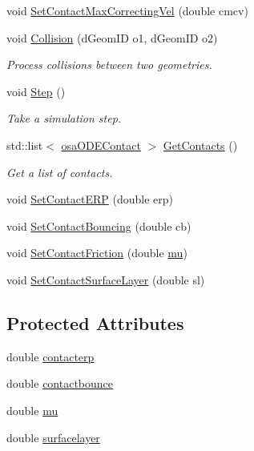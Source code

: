 \begin{DoxyCompactItemize}
\item 
void \hyperlink{classosa_o_d_e_world_a9fd2c069bfb1ad2f292311bc2dac78e5}{Set\+Contact\+Max\+Correcting\+Vel} (double cmcv)
\item 
void \hyperlink{classosa_o_d_e_world_ac259e47ae2b8f33f653e1ebfae73dce9}{Collision} (d\+Geom\+I\+D o1, d\+Geom\+I\+D o2)
\begin{DoxyCompactList}\small\item\em Process collisions between two geometries. \end{DoxyCompactList}\item 
void \hyperlink{classosa_o_d_e_world_ad355de908d3d45436dadf47c542c4182}{Step} ()
\begin{DoxyCompactList}\small\item\em Take a simulation step. \end{DoxyCompactList}\item 
std\+::list$<$ \hyperlink{structosa_o_d_e_contact}{osa\+O\+D\+E\+Contact} $>$ \hyperlink{classosa_o_d_e_world_a6e75ac4b7140e26bb381f1f5f388e998}{Get\+Contacts} ()
\begin{DoxyCompactList}\small\item\em Get a list of contacts. \end{DoxyCompactList}\item 
void \hyperlink{classosa_o_d_e_world_a43e84fc406edd956147c746de290ad5c}{Set\+Contact\+E\+R\+P} (double erp)
\item 
void \hyperlink{classosa_o_d_e_world_a107cf01ae0e9f24279673a406429b059}{Set\+Contact\+Bouncing} (double cb)
\item 
void \hyperlink{classosa_o_d_e_world_abacdd957195b8877c13ff75c627897d9}{Set\+Contact\+Friction} (double \hyperlink{classosa_o_d_e_world_ad480cb0282cb22313a485083b24dd242}{mu})
\item 
void \hyperlink{classosa_o_d_e_world_a45166aabfeeeed39909c7e44933d775b}{Set\+Contact\+Surface\+Layer} (double sl)
\end{DoxyCompactItemize}
\subsection*{Protected Attributes}
\begin{DoxyCompactItemize}
\item 
double \hyperlink{classosa_o_d_e_world_aade62058b4fd841e2d78cc9bdbf83b5d}{contacterp}
\item 
double \hyperlink{classosa_o_d_e_world_a32473325798a042ba65d0bcf43b11860}{contactbounce}
\item 
double \hyperlink{classosa_o_d_e_world_ad480cb0282cb22313a485083b24dd242}{mu}
\item 
double \hyperlink{classosa_o_d_e_world_a36fb96aa0db1cb3a9d38f7183be41389}{surfacelayer}
\end{DoxyCompactItemize}
